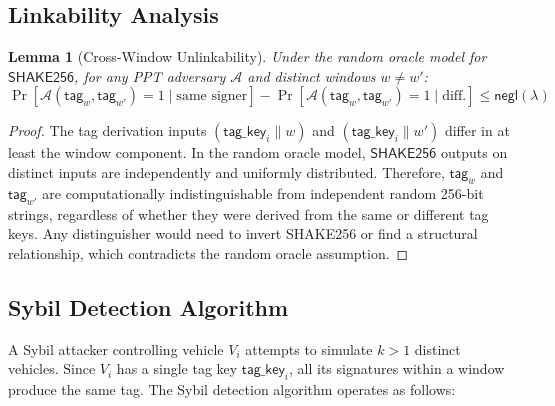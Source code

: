 \documentclass[conference,10pt]{IEEEtran}
\newcommand{\shake}{\textsf{SHAKE256}}
\newcommand{\secparam}{\lambda}
\newcommand{\advA}{\mathcal{A}}
\newcommand{\negl}{\mathsf{negl}}
\newtheorem{lemma}[theorem]{Lemma}
\begin{document}
\subsection{Linkability Analysis}

\begin{lemma}[Cross-Window Unlinkability]
\label{lem:unlinkability}
Under the random oracle model for $\shake$, for any PPT adversary $\advA$ and distinct windows $w \neq w'$:
\begin{equation}
\Pr[\advA(\mathsf{tag}_w, \mathsf{tag}_{w'}) = 1 \mid \text{same signer}] - \Pr[\advA(\mathsf{tag}_w, \mathsf{tag}_{w'}) = 1 \mid \text{diff.}] \leq \negl(\secparam)
\end{equation}
\end{lemma}

\begin{proof}
The tag derivation inputs $(\mathsf{tag\_key}_i \| w)$ and $(\mathsf{tag\_key}_i \| w')$ differ in at least the window component. In the random oracle model, $\shake$ outputs on distinct inputs are independently and uniformly distributed. Therefore, $\mathsf{tag}_w$ and $\mathsf{tag}_{w'}$ are computationally indistinguishable from independent random 256-bit strings, regardless of whether they were derived from the same or different tag keys. Any distinguisher would need to invert \shake{} or find a structural relationship, which contradicts the random oracle assumption.
\end{proof}

\subsection{Sybil Detection Algorithm}

A Sybil attacker controlling vehicle $V_i$ attempts to simulate $k > 1$ distinct vehicles. Since $V_i$ has a single tag key $\mathsf{tag\_key}_i$, all its signatures within a window produce the same tag. The Sybil detection algorithm operates as follows:
\end{document}
